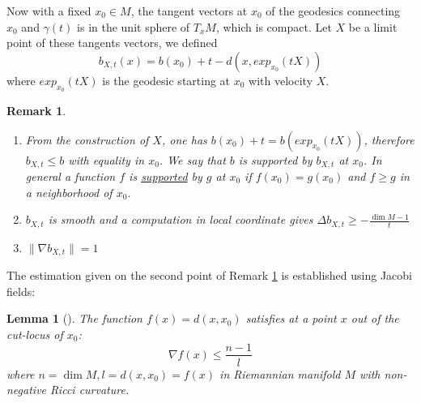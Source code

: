 \documentclass[11pt]{article}
\newtheorem{remark}{Remark}
\newtheorem{lemma}[theorem]{Lemma}
\begin{document}
Now with a fixed \(x_0\in M\), the tangent vectors at \(x_0\) of the geodesics connecting \(x_0\) and
\(\gamma(t)\) is in the unit sphere of \(T_xM\), which is compact. Let \(X\) be a limit point of these
tangents vectors, we defined
\[
b_{X,t}(x) = b(x_0) + t - d(x, exp_{x_0}(tX))
\]
where \(exp_{x_0}(tX)\) is the geodesic starting at \(x_0\) with velocity \(X\).

\begin{remark}
\label{rem:3-calcul-cheeger-gromoll}
\label{org584320e}
\begin{enumerate}
\item From the construction of \(X\), one has \(b(x_0) + t = b(exp_{x_0}(tX))\), therefore \(b_{X,t} \leq b\) with
equality in \(x_0\). We say that \(b\) is supported by \(b_{X,t}\) at \(x_0\). In general a function \(f\) 
is \uline{supported} by \(g\) at \(x_0\) if \(f(x_0)=g(x_0)\) and \(f\geq g\) in a neighborhood of \(x_0\).
\item \(b_{X,t}\) is smooth and a computation in local coordinate gives \(\Delta b_{X,t} \geq -\frac{\dim
   M - 1}{t}\)
\item \(\|\nabla b_{X,t}\| = 1\)
\end{enumerate}
\end{remark}

The estimation given on the second point of Remark \ref{rem:3-calcul-cheeger-gromoll} is established
using Jacobi fields:

\begin{lemma}[]
The function \(f(x) = d(x,x_0)\) satisfies at a point \(x\) out of the cut-locus of \(x_0\):
\[
\nabla f(x) \leq \frac{n-1}{l}
\]
where \(n=\dim M, l = d(x,x_0) = f(x)\) in Riemannian manifold \(M\) with non-negative Ricci curvature.
\end{lemma}
\end{document}
